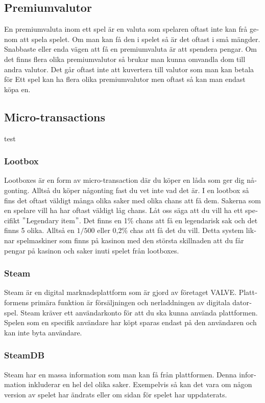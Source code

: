 \documentclass[11p]{article}
\begin{document}
\begin{otherlanguage}{swedish}
    \subsection{Premiumvalutor}
    En premiumvaluta inom ett spel är en valuta som spelaren oftast inte kan frå genom att spela spelet.
    Om man kan få den i spelet så är det oftast i små mängder.
    Snabbaste eller enda vägen att få en premiumvaluta är att spendera pengar.
    Om det finns flera olika premiumvalutor så brukar man kunna omvandla dom till andra valutor.
    Det går oftast inte att kuvertera till valutor som man kan betala för
    Ett spel kan ha flera olika premiumvalutor men oftast så kan man endast köpa en.

    \subsection{Micro-transactions}
    test

    \subsubsection{Lootbox}
    Lootboxes är en form av micro-transaction där du köper en låda som ger dig någonting.
    Alltså du köper någonting fast du vet inte vad det är.
    I en lootbox så fins det oftast väldigt många olika saker med olika chans att få dem.
    Sakerna som en spelare vill ha har oftast väldigt låg chans.
    Låt oss säga att du vill ha ett specifikt \("\)Legendary item\("\).
    Det finns en 1\% chans att få en legendarisk sak och det finns 5 olika.
    Alltså en \(1/500\) eller 0,2\% chas att få det du vill.
    Detta system liknar spelmaskiner som finns på kasinon med den största skillnaden att du får pengar på kasinon och saker inuti spelet från lootboxes.

    \subsubsection{Steam}
    Steam är en digital marknadsplattform som är gjord av företaget VALVE.
    Plattformens primära funktion är försäljningen och nerladdningen av digitala datorspel.
    Steam kräver ett användarkonto för att du ska kunna använda plattformen.
    Spelen som en specifik användare har köpt sparas endast på den användaren och kan inte byta användare.


    \subsubsection{SteamDB}
    Steam har en massa information som man kan få från plattformen.
    Denna information inkluderar en hel del olika saker.
    Exempelvis så kan det vara om någon version av spelet har ändrats eller om sidan för spelet har uppdaterats.


\end{otherlanguage}
\end{document}
